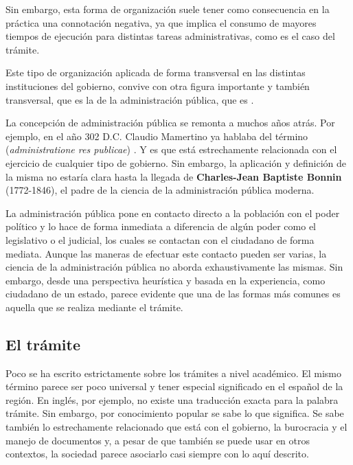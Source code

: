 Sin embargo, esta forma de organización suele tener como consecuencia en la práctica una connotación negativa, %
ya que implica el consumo de mayores tiempos de ejecución para distintas tareas administrativas, como es el caso del trámite.

Este tipo de organización aplicada de forma transversal en las distintas instituciones del gobierno,
convive con otra figura importante y también transversal, que es la de la administración pública,
que es  \cite{guerreroCharlesJeanBonninSiglo2020}.

La concepción de administración pública se remonta a muchos años atrás.
Por ejemplo, en el año 302 D.C. Claudio Mamertino ya hablaba del término  (\textit{administratione res publicae}) \cite{nixonPraiseLaterRoman1994}.
Y es que está estrechamente relacionada con el ejercicio de cualquier tipo de gobierno.
Sin embargo, la aplicación y definición de la misma no estaría clara hasta la llegada de \textbf{Charles-Jean Baptiste Bonnin} (1772-1846),
el padre de la ciencia de la administración pública moderna.

La administración pública pone en contacto directo a la población con el poder político \cite{mostajomachicadoDerechoAdministrativoAdministracion2016}
y lo hace de forma inmediata a diferencia de algún poder como el legislativo o el judicial, los cuales se contactan con el ciudadano de forma mediata.
Aunque las maneras de efectuar este contacto pueden ser varias, la ciencia de la administración pública no aborda exhaustivamente las mismas.
Sin embargo, desde una perspectiva heurística y basada en la experiencia, como ciudadano de un estado, parece evidente que una de las formas más comunes es aquella que se realiza mediante el trámite.

\subsection{El trámite}

Poco se ha escrito estrictamente sobre los trámites a nivel académico.
El mismo término parece ser poco universal y tener especial significado en el español de la región.
En inglés, por ejemplo, no existe una traducción exacta para la palabra trámite.
Sin embargo, por conocimiento popular se sabe lo que significa.
Se sabe también lo estrechamente relacionado que está con el gobierno, la burocracia y el manejo de documentos y,
a pesar de que también se puede usar en otros contextos, la sociedad parece asociarlo casi siempre con lo aquí descrito.

